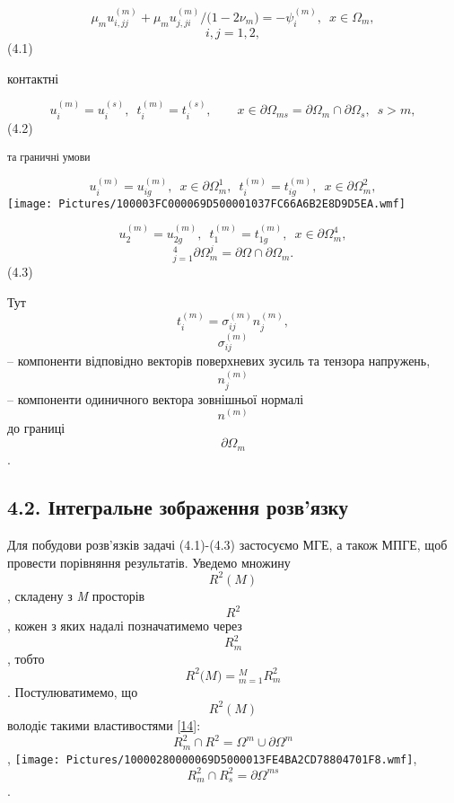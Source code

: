 \[{\mu_{m}{u_{i,\mathit{\text{jj}}}^{(m)} + \mu_{m}}{u_{j,\mathit{\text{ji}}}^{(m)}/(}{1 - 2}\nu_{m}{) = {- \psi_{i}^{(m)}}},\mspace{9mu} x\in\Omega_{m},}{}\]\[{i,{j = 1,2},}{}\](4.1)

контактні

\[{{u_{i}^{(m)} = u_{i}^{(s)}},\mspace{9mu}{t_{i}^{(m)} = t_{i}^{(s)}},\qquad x\in\partial{\Omega_{\mathit{\text{ms}}} = \partial}{\Omega_{m} \cap \partial}\Omega_{s},\mspace{9mu}{s > m},}{}\](4.2)

\textsubscript{та граничні умови}

\[{{u_{i}^{(m)} = u_{\mathit{\text{ig}}}^{(m)}},\mspace{9mu} x\in\partial\Omega_{m}^{1},\mspace{9mu}{t_{i}^{(m)} = t_{\mathit{\text{ig}}}^{(m)}},\mspace{9mu} x\in\partial\Omega_{m}^{2},}{}\]\texttt{[image: Pictures/100003FC000069D500001037FC66A6B2E8D9D5EA.wmf]}

\[{{u_{2}^{(m)} = u_{2g}^{(m)}},\mspace{9mu}{t_{1}^{(m)} = t_{1g}^{(m)}},\mspace{9mu} x\in\partial\Omega_{m}^{4},}{}\]\[{{}_{j = 1}^{4}\partial{\Omega_{m}^{j} = \partial}{\Omega \cap \partial}\Omega_{m}\text{.}}{}\]\textsubscript{}(4.3)

Тут
\[{{t_{i}^{(m)} = \sigma_{\mathit{\text{ij}}}^{(m)}}n_{j}^{(m)},}{}\]\[\sigma_{\mathit{\text{ij}}}^{(m)}{}\]--
компоненти відповідно век­торів поверхневих зу­силь та тензора
напру­жень, \[n_{j}^{(m)}{}\] -- компоненти одиничного вектора
зов­ніш­ньої нормалі \[n^{(m)}{}\]\textsubscript{ }до границі
\[{\partial\Omega_{m}}{}\].

\hypertarget{ux456ux43dux442ux435ux433ux440ux430ux43bux44cux43dux435-ux437ux43eux431ux440ux430ux436ux435ux43dux43dux44f-ux440ux43eux437ux432ux44fux437ux43aux443}{%
\subsection[4.2. Інтегральне зображення
розв'язку]{\texorpdfstring{\protect\hypertarget{anchor-55}{}{}4.2.
Інтегральне зображення
розв'язку}{4.2. Інтегральне зображення розв'язку}}\label{ux456ux43dux442ux435ux433ux440ux430ux43bux44cux43dux435-ux437ux43eux431ux440ux430ux436ux435ux43dux43dux44f-ux440ux43eux437ux432ux44fux437ux43aux443}}

Для побудови розв'язків задачі (4.1)-(4.3) застосуємо МГЕ, а також МПГЕ,
щоб провести порівняння результатів. Уведемо множину \[{R^{2}(M)}{}\],
складену з \emph{M} просторів \[R^{2}{}\], кожен з яких надалі
позначатимемо через \[R_{m}^{2}{}\], тобто
\[{R^{2}(M{) = {}_{m = 1}^{M}}R_{m}^{2}}{}\]. Постулюватимемо, що
\[{R^{2}(M)}{}\] володіє такими властивостями
{[}\protect\hyperlink{anchor-24}{14}{]}:
\[{{{R_{m}^{2} \cap R^{2}} = {\Omega^{m} \cup \partial}}\Omega^{m}}{}\],
\texttt{[image: Pictures/10000280000069D5000013FE4BA2CD78804701F8.wmf]},
\[{{{R_{m}^{2} \cap R_{s}^{2}} = \partial}\Omega^{\mathit{\text{ms}}}}{}\].

